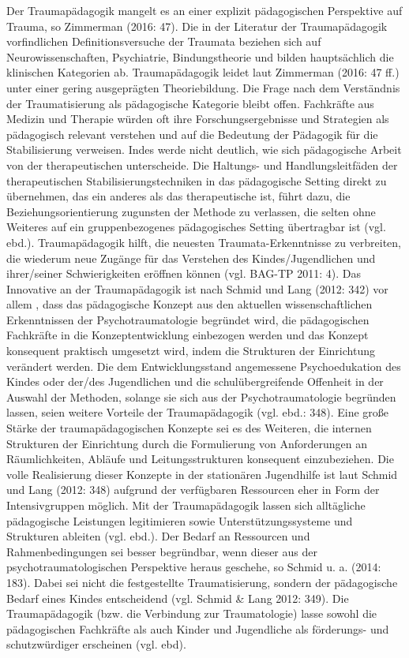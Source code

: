 Der Traumapädagogik mangelt es an einer explizit pädagogischen Perspektive auf Trauma, so Zimmerman (2016: 47). Die in der Literatur der Traumapädagogik vorfindlichen Definitionsversuche der Traumata beziehen sich auf Neurowissenschaften, Psychiatrie, Bindungstheorie und bilden hauptsächlich die klinischen Kategorien ab. Traumap{\"a}dagogik leidet laut Zimmerman (2016: 47 ff.) unter einer gering ausgeprägten Theoriebildung. Die Frage nach dem Verständnis der Traumatisierung als pädagogische Kategorie bleibt offen. Fachkräfte aus Medizin und Therapie würden oft ihre Forschungsergebnisse und Strategien als pädagogisch relevant verstehen und auf die Bedeutung der Pädagogik für die Stabilisierung verweisen. Indes werde nicht deutlich, wie sich pädagogische Arbeit von der therapeutischen unterscheide. Die Haltungs- und Handlungsleitfäden der therapeutischen Stabilisierungstechniken in das pädagogische Setting direkt zu übernehmen, das ein anderes als das therapeutische ist, führt dazu, die Beziehungsorientierung zugunsten der Methode zu verlassen, die selten ohne Weiteres auf ein gruppenbezogenes pädagogisches Setting übertragbar ist (vgl. ebd.). Traumapädagogik hilft, die neuesten Traumata-Erkenntnisse zu verbreiten, die wiederum neue Zugänge für das Verstehen des Kindes/Jugendlichen und ihrer/seiner Schwierigkeiten eröffnen können (vgl. BAG-TP 2011: 4).  
Das Innovative an der Traumap{\"a}dagogik ist nach Schmid und Lang (2012: 342) vor allem , dass das pädagogische Konzept aus den aktuellen wissenschaftlichen Erkenntnissen der Psychotraumatologie begründet wird, die pädagogischen Fachkräfte in die Konzeptentwicklung einbezogen werden und das Konzept konsequent praktisch umgesetzt wird, indem die Strukturen der Einrichtung verändert werden. Die dem Entwicklungsstand angemessene Psychoedukation des Kindes oder der/des Jugendlichen und die schulübergreifende Offenheit in der Auswahl der Methoden, solange sie sich aus der Psychotraumatologie begründen lassen, seien weitere Vorteile der Traumapädagogik (vgl. ebd.: 348). Eine große Stärke der traumapädagogischen Konzepte sei es des Weiteren, die internen Strukturen der Einrichtung durch die Formulierung von Anforderungen an Räumlichkeiten, Abläufe und Leitungsstrukturen konsequent einzubeziehen. Die volle Realisierung dieser Konzepte in der stationären Jugendhilfe ist laut Schmid und Lang (2012: 348) aufgrund der verfügbaren Ressourcen eher in Form der Intensivgruppen möglich. Mit der Traumapädagogik lassen sich alltägliche pädagogische Leistungen legitimieren sowie Unterstützungssysteme und Strukturen ableiten (vgl. ebd.). Der Bedarf an Ressourcen und Rahmenbedingungen sei besser begründbar, wenn dieser aus der psychotraumatologischen Perspektive heraus geschehe, so Schmid u. a. (2014: 183). Dabei sei nicht die festgestellte Traumatisierung, sondern der p{\"a}dagogische Bedarf eines Kindes entscheidend (vgl. Schmid \& Lang 2012: 349). Die Traumapädagogik (bzw. die Verbindung zur Traumatologie) lasse sowohl die pädagogischen Fachkräfte als auch Kinder und Jugendliche als förderungs- und schutzwürdiger erscheinen (vgl. ebd).

